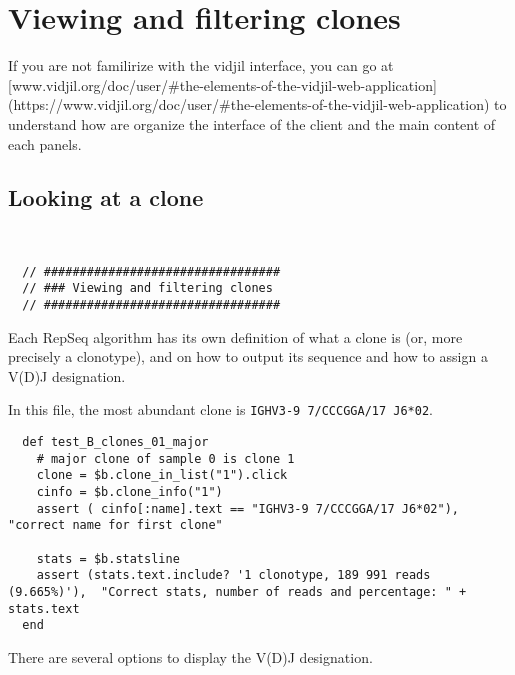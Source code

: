 \section{Viewing and filtering clones}

If you are not familirize with the vidjil interface, you can go at [www.vidjil.org/doc/user/#the-elements-of-the-vidjil-web-application](https://www.vidjil.org/doc/user/#the-elements-of-the-vidjil-web-application) to understand how are organize the interface of the client and the main content of each panels.

\subsection{Looking at a clone}
\begin{verbatim}


  // #################################
  // ### Viewing and filtering clones
  // #################################

\end{verbatim}


Each RepSeq algorithm has its own definition of what a clone is (or, more precisely
a clonotype), and on how to output its sequence and how to assign a V(D)J designation.

In this file, the most abundant clone
is \texttt{IGHV3-9 7/CCCGGA/17 J6*02}.



\begin{verbatim}
  def test_B_clones_01_major
    # major clone of sample 0 is clone 1 
    clone = $b.clone_in_list("1").click
    cinfo = $b.clone_info("1")
    assert ( cinfo[:name].text == "IGHV3-9 7/CCCGGA/17 J6*02"), "correct name for first clone"

    stats = $b.statsline
    assert (stats.text.include? '1 clonotype, 189 991 reads (9.665%)'),  "Correct stats, number of reads and percentage: " + stats.text
  end
\end{verbatim}


There are several options to display the V(D)J designation.


